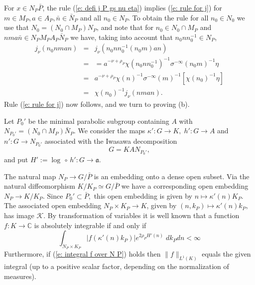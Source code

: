 \documentclass[12pt,a4paper]{article}
\def\msy#1{{\mathbb #1}}
\def\C{{\msy C}}
\def\gs{\sigma}
\def\got#1{\mathfrak #1}
\def\fa{{\got a}}
\def\to{\rightarrow}
\def\after{\,{\scriptstyle\circ}\,}
\def\cK{{\mathcal K}}
\numberwithin{Thm}{section}
\numberwithin{equation}{section}
\numberwithin{equation}{section}
\def\cchi{\chi}
\begin{document}
For $x \in N_P \bar P$, the rule (\ref{e: defi j P gs nu eta}) implies (\ref{e: rule for j}) 
for $m \in M_P, a \in A_P, \bar n \in \bar N_P$ and all $n_0 \in N_P.$ To obtain the rule for all $n_0 \in N_0$ 
we use that $N_0 = (N_0\cap M_P)N_P$, and note that for $n_0 \in N_0\cap M_P$ and 
$nma\bar n \in N_PM_PA_P\bar N_P$ we have, taking into account that
$n_0 n n_0^{-1} \in N_P$, 
\begin{eqnarray*} 
j_\nu(n_0 n man) & = & j_\nu(n_0 n n_0^{-1} (n_0 m)  an) \\
&=& = a^{-\nu + \rho_P}
\cchi(n_0 n n_0^{-1})^{-1} \gs^{-\infty} (n_0 m)^{-1} \eta \\
&=&  
a^{-\nu + \rho_P}  \cchi(n)^{-1} \gs^{-\infty}(m)^{-1} [\cchi(n_0)^{-1} \eta]  \\
 &=&  \cchi(n_0)^{-1} j_\nu(nman).
\end{eqnarray*}
Rule (\ref{e: rule for j}) now follows, and we turn to proving (b). 

Let $P_0'$ be the minimal parabolic subgroup containing $A$ with 
$N_{P_0'} = (N_0\cap M_P) \bar N_P.$ We consider the maps 
$\kappa': G \to K, \; h': G \to A$ and $n': G \to N_{P_0'}$ associated with the Iwasawa
decomposition 
\begin{equation}
\label{e: primed Iwasawa deco}
G = K A N_{P_0'},
\end{equation}
and put $H' := \log \after h': G \to \fa.$ 


The natural map $N_P \to G/\bar P$ is an embedding onto a dense open subset.
Via the natural diffeomorphism $K/K_P \simeq G/\bar P$ we have a corresponding open 
embedding $N_P \to K/K_P.$ Since $P_0' \subset \bar P,$ this open embedding is given 
by $n \mapsto \kappa'(n)K_P.$ The associated open embedding $N_P \times K_P \to K$, 
given by $(n, k_P) \mapsto \kappa'(n) k_P,$ has image $\cK.$ By transformation of variables
it is well known that a function $f: K \to \C$ is absolutely integrable if and only if 
\begin{equation}
\label{e: integral f over N P}
\int_{N_P\times K_P}  |f(\kappa'(n) k_P)| e^{ 2 \rho_P  H'(n)}\; dk_P dn < \infty 
\end{equation}
Furthermore, if (\ref{e: integral f over N P}) holds
then $\|f\|_{L^1(K)} $ equals the given integral 
(up to a positive scalar factor, depending on the normalization of measures).
 
\end{document}
